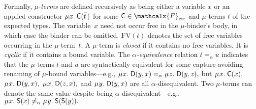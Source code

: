 \documentclass[smallcondensed,draft]{svjour3}
\newcommand\MU{\vvthinspace\mu\vvthinspace}
\newcommand\FV{\mathrm{FV}}
\newcommand\const[1]{\textsf{#1}}
\renewcommand{\vec}[1]{\bar #1}
\newcommand{\rn}[1]{\textsf{#1}}
\newcommand{\aequiv}{\mathrel{=_\alpha}}
\newcommand\Types{\mathcalx{Y}}
\newcommand\Funcs{\mathcalx{F}}
\newcommand\Codata{\Types_{\mathrm{codt}}}
\newcommand\Nondata{\Types_{\mathrm{ord}}}
\newcommand\Ctr{\Funcs_{\smash{\mathrm{ctr}}}}
\newcommand\vvthinspace{\kern+0.041667em}
\begin{document}
Formally, $\mu$-\emph{terms} are defined recursively as being either a variable $x$
or an applied constructor
$\MU x.\: \const{C}( \vec t\, )$ for some $\const{C} \in \Ctr$ and
$\mu$-terms $\vec t$ of the expected types.
The variable~$x$ need not occur free in the $\mu$-binder's body, in which case
the binder can be omitted.
$\FV( t )$ denotes the set of free variables occurring in the $\mu$-term~$t.$
A $\mu$-term is \emph{closed} if %
it contains no free variables. It is \emph{cyclic} if %
it contains a bound variable. The $\alpha$\emph{-equiv\-alence} relation $t \aequiv u$
indicates that the $\mu$-terms $t$ and $u$
are syntactically equivalent for some capture-avoiding renaming of $\mu$-bound variables---e.g.,
$\MU x.\; \const{D}( y, x ) \aequiv \MU z.\; \const{D}( y, z ),$
but
$\MU x.\; \const{C}( x ),$ $\MU x.\; \const{D}( y, x ),$ $\MU x.\; \const{D}( z, x ),$ and
$\MU y.\; \const{D}( y, x )$ are all $\alpha$-disequivalent.
Two $\mu$-terms can denote the same value despite being $\alpha$-disequivalent---e.g.,
$\MU x.\; \const{S}( x ) \not\aequiv \MU y.\; \const{S}( \const{S}( y ) ).$


%
%
%
\end{document}

